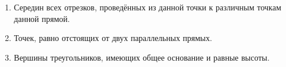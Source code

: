 \documentclass[twoside]{book}
\begin{document}
\begin{center}
\end{center}

\begin{enumerate}


 \item
Середин всех отрезков, проведённых из данной точки к различным точкам данной прямой.

 \item
Точек, равно отстоящих от двух параллельных прямых.

 \item
Вершины треугольников, имеющих общее основание и равные высоты.
\end{enumerate}
\begin{center}
\end{center}
\end{document}
